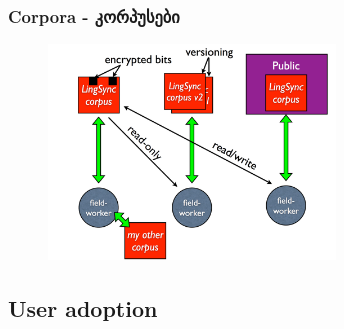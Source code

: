 \documentclass{beamer}
\begin{document}
\begin{frame}
\frametitle{Corpora - კორპუსები}

\begin{figure}
\begin{center}
\includegraphics[width=3in]{../figures/corpora}
\label{lingsync:corpora}
\end{center}
\end{figure}
\end{frame}




\subsection{User adoption}
\end{document}
